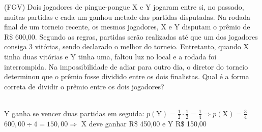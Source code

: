 \begin{ex}
 (FGV) Dois jogadores de pingue-pongue X e Y jogaram entre si, no passado, muitas partidas e cada um ganhou metade das partidas disputadas. Na rodada final de um torneio recente, os mesmos jogadores, X e Y disputam o prêmio de R\$ 600,00. Segundo as regras, partidas serão realizadas até que um dos jogadores consiga 3 vitórias, sendo declarado o melhor do torneio. Entretanto, quando X tinha duas  vitórias e Y tinha uma, faltou luz no local e a rodada foi interrompida. Na impossibilidade de adiar para outro dia, o diretor do torneio determinou que o prêmio fosse dividido entre os dois finalistas. Qual é a forma correta de dividir o prêmio entre os dois jogadores?
   \begin{sol}
     \phantom{A} \\
     Y ganha se vencer duas partidas em seguida: $p(\mathrm{Y})=\frac{1}{2}\cdot\frac{1}{2}=\frac{1}{4}\Longrightarrow p(\mathrm{X})=\frac{3}{4}$ \\
     $600,00 \div4=150,00\Longrightarrow$ X deve ganhar R\$ 450,00 e Y R\$ 150,00
   \end{sol}
\end{ex}